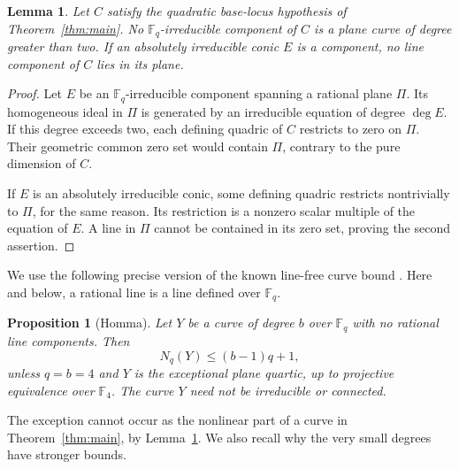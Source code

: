 \documentclass[11pt]{article}
\newtheorem{lemma}[theorem]{Lemma}
\newtheorem{proposition}[theorem]{Proposition}
\theoremstyle{remark}\newtheorem{remark}[theorem]{Remark}
\newcommand{\F}{\mathbb F}
\newcommand{\Nq}{N_q}
\begin{document}
\begin{lemma}\label{lem:plane}
Let $C$ satisfy the quadratic base-locus hypothesis of Theorem~\ref{thm:main}. No $\F_q$-irreducible component of $C$ is a plane curve of degree greater than two. If an absolutely irreducible conic $E$ is a component, no line component of $C$ lies in its plane.
\end{lemma}
\begin{proof}
Let $E$ be an $\F_q$-irreducible component spanning a rational plane $\Pi$. Its homogeneous ideal in $\Pi$ is generated by an irreducible equation of degree $\deg E$. If this degree exceeds two, each defining quadric of $C$ restricts to zero on $\Pi$. Their geometric common zero set would contain $\Pi$, contrary to the pure dimension of $C$.

If $E$ is an absolutely irreducible conic, some defining quadric restricts nontrivially to $\Pi$, for the same reason. Its restriction is a nonzero scalar multiple of the equation of $E$. A line in $\Pi$ cannot be contained in its zero set, proving the second assertion.
\end{proof}

We use the following precise version of the known line-free curve bound \cite[Corollary 1.2]{Homma}. Here and below, a rational line is a line defined over $\F_q$.

\begin{proposition}[Homma]\label{prop:homma}
Let $Y$ be a curve of degree $b$ over $\F_q$ with no rational line components. Then
\begin{equation}\label{eq:homma}
 \Nq(Y)\le(b-1)q+1,
\end{equation}
unless $q=b=4$ and $Y$ is the exceptional plane quartic, up to projective equivalence over $\F_4$. The curve $Y$ need not be irreducible or connected.
\end{proposition}

The exception cannot occur as the nonlinear part of a curve in Theorem~\ref{thm:main}, by Lemma~\ref{lem:plane}. We also recall why the very small degrees have stronger bounds.
\end{document}
